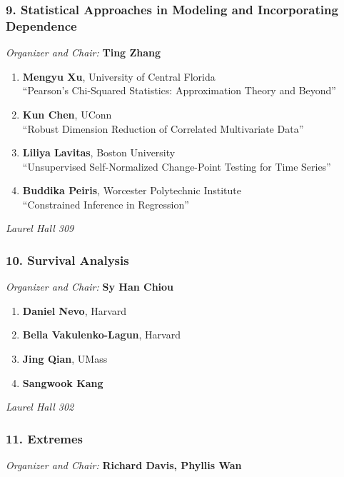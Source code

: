 \subsubsection*{9. Statistical Approaches in Modeling and Incorporating Dependence}

\emph{Organizer and Chair:} \textbf{Ting Zhang}

\begin{enumerate}
\item \textbf{Mengyu Xu}, University of Central Florida \\
``Pearson’s Chi-Squared Statistics: Approximation Theory and Beyond''
\item \textbf{Kun Chen}, UConn \\
``Robust Dimension Reduction of Correlated Multivariate Data''
\item \textbf{Liliya Lavitas}, Boston University \\
``Unsupervised Self-Normalized Change-Point Testing for Time Series''
\item \textbf{Buddika Peiris}, Worcester Polytechnic Institute \\
``Constrained Inference in Regression''
\end{enumerate}

\emph{Laurel Hall 309} \\[.5em]

\subsubsection*{10. Survival Analysis}

\emph{Organizer and Chair:} \textbf{Sy Han Chiou}

\begin{enumerate}
\item \textbf{Daniel Nevo}, Harvard 
\item \textbf{Bella Vakulenko-Lagun}, Harvard 
\item \textbf{Jing Qian}, UMass 
\item \textbf{Sangwook Kang} 
\end{enumerate}

\emph{Laurel Hall 302} \\[.5em]

\subsubsection*{11. Extremes}

\emph{Organizer and Chair:} \textbf{Richard Davis, Phyllis Wan}

